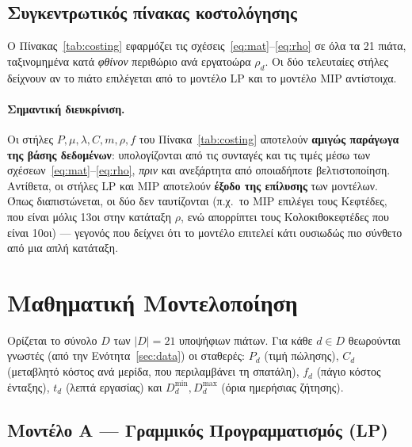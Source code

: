 \documentclass[11pt,a4paper]{article}
\newcommand{\en}[1]{\textenglish{#1}}
\begin{document}
\subsection{Συγκεντρωτικός πίνακας κοστολόγησης}
Ο Πίνακας~\ref{tab:costing} εφαρμόζει τις σχέσεις~\eqref{eq:mat}--\eqref{eq:rho} σε
όλα τα 21 πιάτα, ταξινομημένα κατά \emph{φθίνον} περιθώριο ανά εργατοώρα $\rho_d$.
Οι δύο τελευταίες στήλες δείχνουν αν το πιάτο επιλέγεται από το μοντέλο \en{LP} και
το μοντέλο \en{MIP} αντίστοιχα.

\begin{table}[htbp]
\centering
\caption{Πλήρης κοστολόγηση των 21 πιάτων, ταξινομημένα κατά $\rho_d$ (€/ώρα).
$P$: τιμή· $\mu$: υλικά· $\lambda$: εργασία· $C$: μεταβλητό κόστος· $m$: περιθώριο·
$\rho$: περιθώριο/ώρα· $f$: πάγιο κόστος. Όλα τα νομισματικά μεγέθη σε €.}
\label{tab:costing}
\small

\end{table}

\paragraph{Σημαντική διευκρίνιση.} Οι στήλες $P,\mu,\lambda,C,m,\rho,f$ του
Πίνακα~\ref{tab:costing} αποτελούν \textbf{αμιγώς παράγωγα της βάσης δεδομένων}:
υπολογίζονται από τις συνταγές και τις τιμές μέσω των σχέσεων~\eqref{eq:mat}--\eqref{eq:rho},
\emph{πριν} και ανεξάρτητα από οποιαδήποτε βελτιστοποίηση. Αντίθετα, οι στήλες
\en{LP} και \en{MIP} αποτελούν \textbf{έξοδο της επίλυσης} των μοντέλων. Όπως
διαπιστώνεται, οι δύο δεν ταυτίζονται (π.χ.\ το \en{MIP} επιλέγει τους Κεφτέδες, που
είναι μόλις 13οι στην κατάταξη $\rho$, ενώ απορρίπτει τους Κολοκιθοκεφτέδες που
είναι 10οι) --- γεγονός που δείχνει ότι το μοντέλο επιτελεί κάτι ουσιωδώς πιο
σύνθετο από μια απλή κατάταξη.

\section{Μαθηματική Μοντελοποίηση}\label{sec:model}
Ορίζεται το σύνολο $D$ των $|D|=21$ υποψήφιων πιάτων. Για κάθε $d\in D$ θεωρούνται
γνωστές (από την Ενότητα~\ref{sec:data}) οι σταθερές: $P_d$ (τιμή πώλησης), $C_d$
(μεταβλητό κόστος ανά μερίδα, που περιλαμβάνει τη σπατάλη), $f_d$ (πάγιο κόστος
ένταξης), $t_d$ (λεπτά εργασίας) και $D_d^{\min}, D_d^{\max}$ (όρια ημερήσιας
ζήτησης).

\subsection{Μοντέλο Α — Γραμμικός Προγραμματισμός (\en{LP})}
\end{document}
